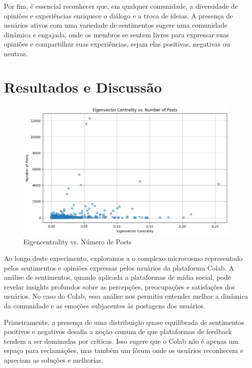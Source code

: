 Por fim, é essencial reconhecer que, em qualquer comunidade, a diversidade de opiniões e experiências enriquece o diálogo e a troca de ideias. A presença de usuários ativos com uma variedade de sentimentos sugere uma comunidade dinâmica e engajada, onde os membros se sentem livres para expressar suas opiniões e compartilhar suas experiências, sejam elas positivas, negativas ou neutras.

\section{Resultados e Discussão}

\begin{figure}[!htb]
	\caption{Eigencentrality vs. Número de Posts}
	\label{fig:eigencentrality_vs_number_of_posts}
	\centering
	\includegraphics[scale=0.70]{images/eigencentrality_vs_number_of_posts.png}
	\fautor
\end{figure}

Ao longo deste experimento, exploramos a o complexo microcosmo representado pelos sentimentos e opiniões expressas pelos usuários da plataforma Colab. A análise de sentimentos, quando aplicada a plataformas de mídia social, pode revelar insights profundos sobre as percepções, preocupações e satisfações dos usuários. No caso do Colab, essa análise nos permitiu entender melhor a dinâmica da comunidade e as emoções subjacentes às postagens dos usuários.

Primeiramente, a presença de uma distribuição quase equilibrada de sentimentos positivos e negativos desafia a noção comum de que plataformas de feedback tendem a ser dominadas por críticas. Isso sugere que o Colab não é apenas um espaço para reclamações, mas também um fórum onde os usuários reconhecem e apreciam as soluções e melhorias.

